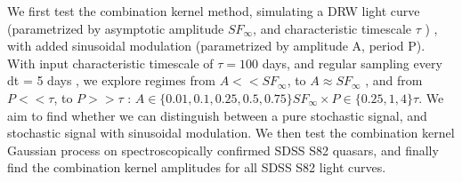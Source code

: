 \documentclass[modern]{aastex62}
\begin{document}
We first test the combination kernel method, simulating a DRW light curve (parametrized by asymptotic amplitude $SF_{\infty}$, and characteristic timescale $\tau$ ) , with  added sinusoidal modulation (parametrized by amplitude A, period P). With input characteristic timescale of $\tau  = 100 $ days, and regular sampling every dt = 5 days  , we explore regimes from $A << SF_{\infty}$,  to $A \approx SF_{\infty}$ , and from $P << \tau$, to $P >> \tau$ :  $A \in \{ 0.01,  0.1,  0.25,  0.5, 0.75 \} SF_{\infty}  \times  P \in \{ 0.25,  1 ,  4 \} \tau  $. We aim to find whether we can distinguish between a pure stochastic signal, and stochastic signal with sinusoidal modulation. We then test the combination kernel Gaussian process on spectroscopically confirmed SDSS S82 quasars, and finally find  the combination kernel amplitudes for all SDSS S82 light curves.
\end{document}
